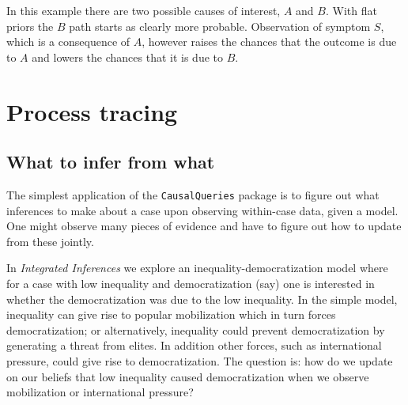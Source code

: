 \documentclass[
  12pt,
]{book}
\newenvironment{Shaded}{\begin{snugshade}}{\end{snugshade}}
\newcommand{\KeywordTok}[1]{\textcolor[rgb]{0.13,0.29,0.53}{\textbf{#1}}}
\newcommand{\NormalTok}[1]{#1}
\newcommand{\OperatorTok}[1]{\textcolor[rgb]{0.81,0.36,0.00}{\textbf{#1}}}
\newcommand{\StringTok}[1]{\textcolor[rgb]{0.31,0.60,0.02}{#1}}
\begin{document}
In this example there are two possible causes of interest, \(A\) and \(B\). With flat priors the \(B\) path starts as clearly more probable. Observation of symptom \(S\), which is a consequence of \(A\), however raises the chances that the outcome is due to \(A\) and lowers the chances that it is due to \(B\).

\hypertarget{process-tracing}{%
\chapter{Process tracing}\label{process-tracing}}

\hypertarget{what-to-infer-from-what}{%
\section{What to infer from what}\label{what-to-infer-from-what}}

The simplest application of the \texttt{CausalQueries} package is to figure out what inferences to make about a case upon observing within-case data, given a model. One might observe many pieces of evidence and have to figure out how to update from these jointly.

In \emph{Integrated Inferences} we explore an inequality-democratization model where for a case with low inequality and democratization (say) one is interested in whether the democratization was due to the low inequality. In the simple model, inequality can give rise to popular mobilization which in turn forces democratization; or alternatively, inequality could prevent democratization by generating a threat from elites. In addition other forces, such as international pressure, could give rise to democratization. The question is: how do we update on our beliefs that low inequality caused democratization when we observe mobilization or international pressure?

\begin{Shaded}
\end{Shaded}
\end{document}
